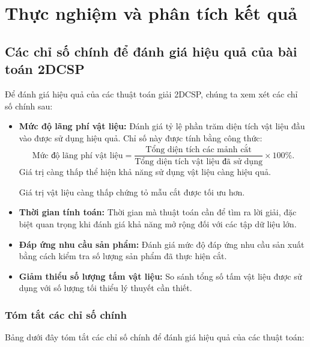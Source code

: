 \section{Thực nghiệm và phân tích kết quả}
\subsection{Các chỉ số chính để đánh giá hiệu quả của bài toán 2DCSP}

\hspace{0.5cm}Để đánh giá hiệu quả của các thuật toán giải 2DCSP, chúng ta xem xét các chỉ số chính sau:

\begin{itemize}
    \item \textbf{Mức độ lãng phí vật liệu:} Đánh giá tỷ lệ phần trăm diện tích vật liệu đầu vào được sử dụng hiệu quả. Chỉ số này được tính bằng công thức:
    \[
    \text{Mức độ lãng phí vật liệu} = \frac{\text{Tổng diện tích các mảnh cắt}}{\text{Tổng diện tích vật liệu đã sử dụng}} \times 100\%.
    \]
    Giá trị càng thấp thể hiện khả năng sử dụng vật liệu càng hiệu quả.
    
    Giá trị vật liệu càng thấp chứng tỏ mẫu cắt được tối ưu hơn.

    \item \textbf{Thời gian tính toán:} Thời gian mà thuật toán cần để tìm ra lời giải, đặc biệt quan trọng khi đánh giá khả năng mở rộng đối với các tập dữ liệu lớn.

    \item \textbf{Đáp ứng nhu cầu sản phẩm:} Đánh giá mức độ đáp ứng nhu cầu sản xuất bằng cách kiểm tra số lượng sản phẩm đã thực hiện cắt.

    \item \textbf{Giảm thiểu số lượng tấm vật liệu:} So sánh tổng số tấm vật liệu được sử dụng với số lượng tối thiểu lý thuyết cần thiết.
\end{itemize}

\subsubsection{Tóm tắt các chỉ số chính}

Bảng dưới đây tóm tắt các chỉ số chính để đánh giá hiệu quả của các thuật toán:

